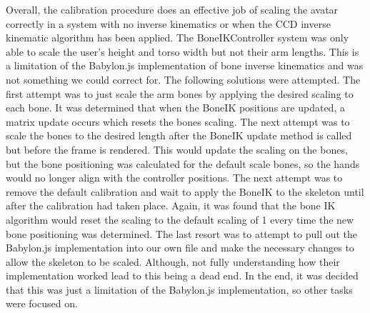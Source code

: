 \documentclass{vgtc}                          %
\begin{document}
Overall, the calibration procedure does an effective job of scaling the avatar correctly in a system with no inverse kinematics or when the CCD inverse kinematic algorithm has been applied. The BoneIKController system was only able to scale the user’s height and torso width but not their arm lengths. This is a limitation of the Babylon.js implementation of bone inverse kinematics and was not something we could correct for. The following solutions were attempted. The first attempt was to just scale the arm bones by applying the desired scaling to each bone. It was determined that when the BoneIK positions are updated, a matrix update occurs which resets the bones scaling. The next attempt was to scale the bones to the desired length after the BoneIK update method is called but before the frame is rendered. This would update the scaling on the bones, but the bone positioning was calculated for the default scale bones, so the hands would no longer align with the controller positions. The next attempt was to remove the default calibration and wait to apply the BoneIK to the skeleton until after the calibration had taken place. Again, it was found that the bone IK algorithm would reset the scaling to the default scaling of 1 every time the new bone positioning was determined. The last resort was to attempt to pull out the Babylon.js implementation into our own file and make the necessary changes to allow the skeleton to be scaled. Although, not fully understanding how their implementation worked lead to this being a dead end. In the end, it was decided that this was just a limitation of the Babylon.js implementation, so other tasks were focused on.
\end{document}
